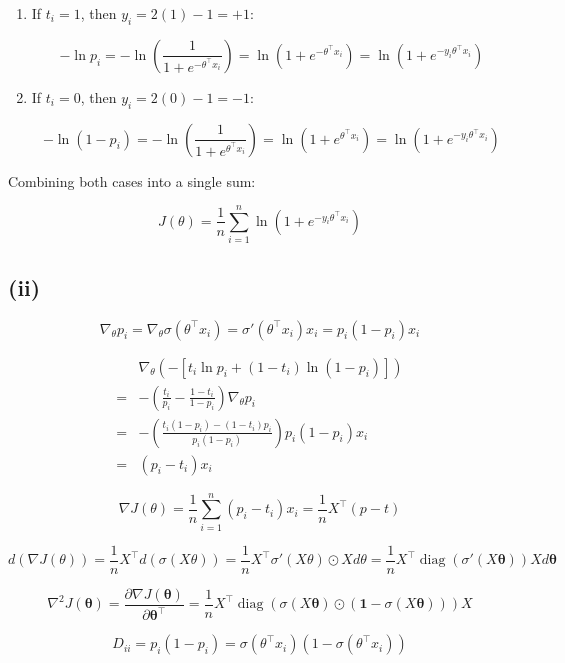 \documentclass[11pt]{article}
\begin{document}
\begin{enumerate}
    \item If $t_i = 1$, then $y_i = 2(1) - 1 = +1$:
    
    $$
    -\ln p_i = -\ln \left( \frac{1}{1 + e^{-\theta^\top x_i}} \right) = \ln(1 + e^{-\theta^\top x_i}) = \ln(1 + e^{-y_i \theta^\top x_i})
    $$
    
    \item If $t_i = 0$, then $y_i = 2(0) - 1 = -1$:
    
    $$
    -\ln(1 - p_i) = -\ln \left( \frac{1}{1 + e^{\theta^\top x_i}} \right) = \ln(1 + e^{\theta^\top x_i}) = \ln(1 + e^{-y_i \theta^\top x_i})
    $$
\end{enumerate}

Combining both cases into a single sum:

$$
J(\theta) = \frac{1}{n} \sum_{i=1}^n \ln(1 + e^{-y_i \theta^\top x_i})
$$

\subsection*{(ii)}

$$
\nabla_\theta p_i = \nabla_\theta \sigma(\theta^\top x_i) = \sigma'(\theta^\top x_i) x_i = p_i(1 - p_i) x_i
$$

$$
\begin{aligned}
&\nabla_\theta \left( -[t_i \ln p_i + (1 - t_i) \ln (1 - p_i)] \right) \\
=& -\left( \frac{t_i}{p_i} - \frac{1 - t_i}{1 - p_i} \right) \nabla_\theta p_i \\
=& -\left( \frac{t_i(1 - p_i) - (1 - t_i)p_i}{p_i(1 - p_i)} \right) p_i(1 - p_i) x_i \\
=& (p_i - t_i) x_i
\end{aligned}
$$

$$
\nabla J(\theta) = \frac{1}{n} \sum_{i=1}^n (p_i - t_i) x_i = \frac{1}{n} X^\top (p - t)
$$

$$
d (\nabla J(\theta))
= \frac{1}{n} X^\top d(\sigma(X \theta))
= \frac{1}{n} X^\top \sigma'(X \theta) \odot X d \theta
= \frac{1}{n} X^\top \operatorname{diag}(\sigma'(X \boldsymbol{\theta})) X d\boldsymbol{\theta}
$$

$$
\nabla^2 J(\boldsymbol{\theta}) = \frac{\partial \nabla J(\boldsymbol{\theta})}{\partial \boldsymbol{\theta}^\top} = \frac{1}{n} X^\top \operatorname{diag}\left(\sigma(X\boldsymbol{\theta}) \odot (\mathbf{1} - \sigma(X\boldsymbol{\theta}))\right) X
$$

$$
D_{ii} = p_i(1 - p_i) = \sigma(\theta^\top x_i)(1 - \sigma(\theta^\top x_i))
$$
\end{document}
